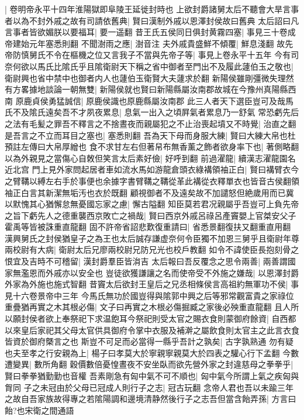 |{
	卷明帝永平十四年淮陽獄即阜陵王延徙封時也}
上欲封爵諸舅太后不聽會大旱言事者以為不封外戚之故有司請依舊典|{
	賢曰漢制外戚以恩澤封侯故曰舊典}
太后詔曰凡言事者皆欲媚朕以要福耳|{
	要一遥翻}
昔王氏五侯同日俱封黄霧四塞|{
	事見三十卷成帝建始元年塞悉則翻}
不聞澍雨之應|{
	澍音注}
夫外戚貴盛鮮不傾覆|{
	鮮息淺翻}
故先帝防慎舅氏不令在樞機之位又言我子不當與先帝子等|{
	事見上卷永平十五年}
今有司奈何欲以馬氏比隂氏乎且隂衛尉天下稱之省中御者至門出不及履此蘧伯玉之敬也|{
	衛尉興也省中禁中也御者内人也蘧伯玉衛賢大夫蘧求於翻}
新陽侯雖剛彊微失理然有方畧據地談論一朝無雙|{
	新陽侯就也賢曰新陽縣屬汝南郡故城在今豫州真陽縣西南}
原鹿貞侯勇猛誠信|{
	原鹿侯識也原鹿縣屬汝南郡}
此三人者天下選臣豈可及哉馬氏不及隂氏遠矣吾不才夙夜累息|{
	息氣一出入之頃屛氣者累息乃一舒氣}
常恐虧先后之法有毛髪之罪吾不釋言之不捨晝夜而親屬犯之不止治喪起墳又不時覺|{
	治直之翻}
是吾言之不立而耳目之塞也|{
	塞悉則翻}
吾為天下母而身服大練|{
	賢曰大練大帛也杜預註左傳曰大帛厚繒也}
食不求甘左右但著帠布無香薰之飾者欲身率下也|{
	著側略翻}
以為外親見之當傷心自敇但笑言太后素好儉|{
	好呼到翻}
前過濯龍|{
	續漢志濯龍園名近北宫}
門上見外家問起居者車如流水馬如游龍倉頭衣綠褠領袖正白|{
	賢曰褠臂衣今之臂鞲以縛左右手於事便也余據字書臂鞲之鞲從革此褠從衣釋單衣也皆音古侯翻領袖正白言其新潔無垢汚也衣於既翻}
顧視御者不及遠矣故不加譴怒但絶歲用而已冀以默愧其心猶懈怠無憂國忘家之慮|{
	懈古隘翻}
知臣莫若君况親屬乎吾豈可上負先帝之旨下虧先人之德重襲西京敗亡之禍哉|{
	賢曰西京外戚呂祿呂產竇嬰上官桀安父子霍禹等皆被誅重直龍翻}
固不許帝省詔悲歎復重請曰|{
	省悉景翻復扶又翻重直用翻}
漢興舅氏之封侯猶皇子之為王也太后誠存謙虚奈何令臣獨不加恩三舅乎且衛尉年尊兩校尉有大病|{
	衛尉太后兄廖兩校尉兄防兄光也校戶教翻}
如令不諱使臣長抱刻骨之恨宜及吉時不可稽留|{
	漢封爵羣臣皆㳙吉}
太后報曰吾反覆念之思令兩善|{
	兩善謂國家無濫恩而外戚亦以安全也}
豈徒欲獲謙讓之名而使帝受不外施之嫌哉|{
	以恩澤封爵外家為外施也施式智翻}
昔竇太后欲封王皇后之兄丞相條侯言高祖約無軍功不侯|{
	事見十六卷景帝中三年}
今馬氏無功於國豈得與隂郭中興之后等邪常觀富貴之家祿位重疊猶再實之木其根必傷|{
	文子曰再實之木根必傷掘臧之家後必殃重直龍翻}
且人所以願封侯者欲上奉祭祀下求温飽耳今祭祀則受太官之賜衣食則蒙御府餘資|{
	自西都以來皇后家祀其父母太官供具御府令掌中衣服及補澣之屬飲食則太官主之此言衣食皆資於御府槩言之也}
斯豈不可足而必當得一縣乎吾計之孰矣|{
	古字孰熟通}
勿有疑也夫至孝之行安親為上|{
	楊子曰孝莫大於寧親寧親莫大於四表之驩心行下孟翻}
今數遭變異|{
	數所角翻}
穀價數倍憂惶晝夜不安坐臥而欲先營外家之封違慈母之拳拳乎|{
	賢曰拳拳猶勤勤也音權}
吾素剛急有匈中氣不可不順也|{
	匈中氣今所謂上氣之疾匈與胷同}
子之未冠由於父母已冠成人則行子之志|{
	冠古玩翻}
念帝人君也吾以未踰三年之故自吾家族故得專之若隂陽調和邊境清静然後行子之志吾但當含飴弄孫|{
	方言曰飴?也宋衛之間通語}
